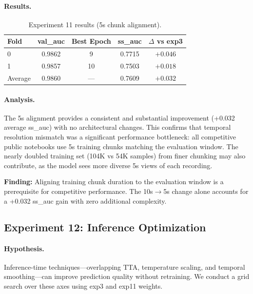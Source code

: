\paragraph{Results.}
\begin{table}[h]
\centering
\caption{Experiment 11 results (5s chunk alignment).}
\label{tab:exp11}
\begin{tabular}{lcccc}
\hline
\textbf{Fold} & \textbf{val\_auc} & \textbf{Best Epoch} & \textbf{ss\_auc} & \textbf{$\Delta$ vs exp3} \\
\hline
0 & 0.9862 & 9  & 0.7715 & $+0.046$ \\
1 & 0.9857 & 10 & 0.7503 & $+0.018$ \\
\hline
Average & 0.9860 & --- & 0.7609 & $+0.032$ \\
\hline
\end{tabular}
\end{table}

\paragraph{Analysis.}
The 5s alignment provides a consistent and substantial improvement (+0.032
average ss\_auc) with no architectural changes. This confirms that temporal
resolution mismatch was a significant performance bottleneck: all competitive
public notebooks use 5s training chunks matching the evaluation window.
The nearly doubled training set (104K vs 54K samples) from finer chunking
may also contribute, as the model sees more diverse 5s views of each recording.

\textbf{Finding:} Aligning training chunk duration to the evaluation window
is a prerequisite for competitive performance. The 10s$\to$5s change alone
accounts for a +0.032 ss\_auc gain with zero additional complexity.

\subsection{Experiment 12: Inference Optimization}
\label{sec:exp12}

\paragraph{Hypothesis.}
Inference-time techniques---overlapping TTA, temperature scaling, and temporal
smoothing---can improve prediction quality without retraining. We conduct a
grid search over these axes using exp3 and exp11 weights.

